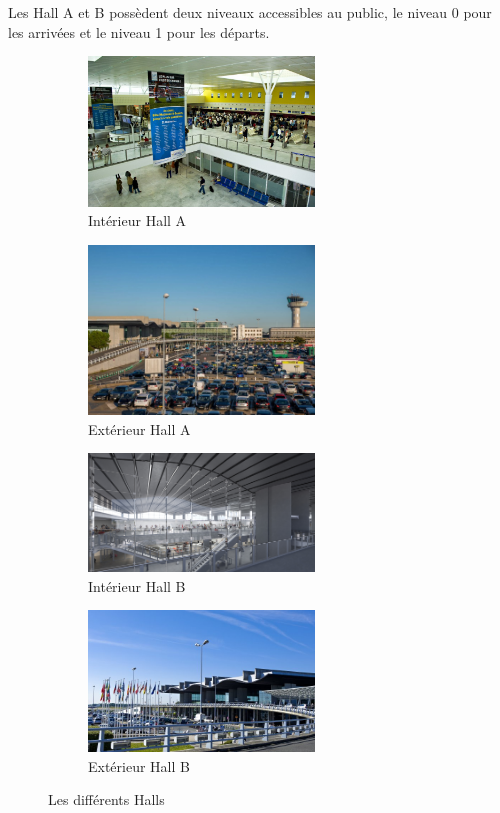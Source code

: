 Les Hall A et B possèdent deux niveaux accessibles au public, le niveau 0 pour les arrivées et le niveau 1 pour les départs.

\begin{figure}[hbt!]
    \begin{subfigure}{0.5\textwidth}
      \centering
      \includegraphics[width=6cm]{Images/inthalla.jpg}  
      \caption{Intérieur Hall A}
      \label{fig:inthalla}
    \end{subfigure}
    \begin{subfigure}{0.5\textwidth}
      \centering
      \includegraphics[width=6cm]{Images/exthalla.jpg}  
      \caption{Extérieur Hall A}
      \label{fig:exthalla}
    \end{subfigure}
        
    \begin{subfigure}{.5\textwidth}
      \centering
      \includegraphics[width=6cm]{Images/inthallb.jpg}  
      \caption{Intérieur Hall B}
      \label{fig:inthallb}
    \end{subfigure}
    \begin{subfigure}{.5\textwidth}
      \centering
      \includegraphics[width=6cm]{Images/exthallb.jpg}  
      \caption{Extérieur Hall B}
      \label{fig:exthallb}
    \end{subfigure}
    \caption{Les différents Halls}
    \label{fig:halls}
\end{figure}


